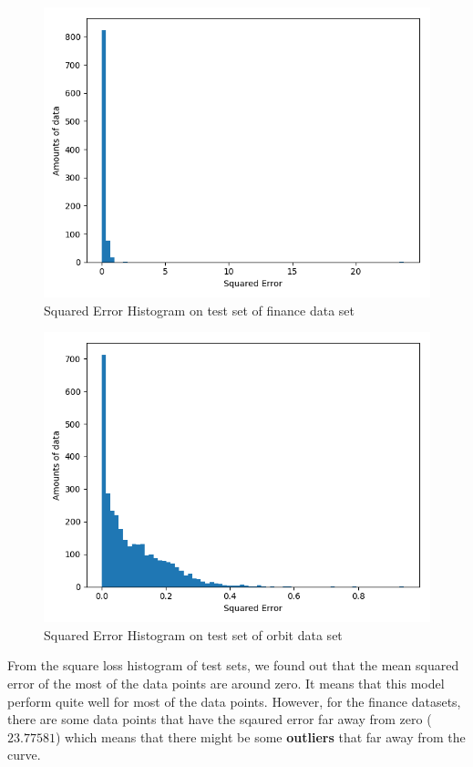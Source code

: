 \documentclass{article}
\begin{document}
\begin{figure}[h]
  \centering
  \includegraphics[scale=0.3]{finance_lg.png}
  \caption{Squared Error Histogram on test set of finance data set}
\end{figure}

\begin{figure}[h]
  \centering
  \includegraphics[scale=0.3]{orbit_lg.png}
  \caption{Squared Error Histogram on test set of orbit data set}
\end{figure}

From the square loss histogram of test sets, we found out that the mean squared error of the most of the data points are around zero. It means that this model perform quite well for most of the data points. However, for the finance datasets, there are some data points that have the sqaured error far away from zero ($23.77581$) which means that there might be some \textbf{outliers} that far away from the curve.
\end{document}
